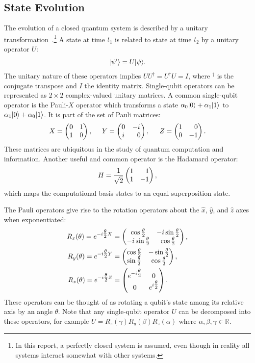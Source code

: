 \subsection{State Evolution} \label{sec:state-evolution}
The evolution of a closed quantum system is described by a unitary transformation~\cite{nielsen2002quantum}.\footnote{In this report, a perfectly closed system is assumed, even though in reality all systems interact somewhat with other systems.}
A state \ket{\psi} at time $t_1$ is related to state  at time $t_2$ by a unitary operator $U$:
\begin{equation}
\vert{\psi'}\rangle = U\vert{\psi}\rangle.
\end{equation}
The unitary nature of these operators implies $UU^\dagger = U^\dagger U = I$, where $^\dagger$ is the conjugate transpose and $I$ the identity matrix.
Single-qubit operators can be represented as $2 \times 2$ complex-valued unitary matrices.
A common single-qubit operator is the Pauli-$X$ operator which transforms a state $\alpha_0\vert{0}\rangle + \alpha_1\vert{1}\rangle$ to $\alpha_1\vert{0}\rangle + \alpha_0\vert{1}\rangle$.
It is part of the set of Pauli matrices:
\begin{equation}
X = \xgate{}, \hspace*{5mm}
Y = \ygate{}, \hspace*{5mm}
Z = \zgate{}.
\end{equation}
These matrices are ubiquitous in the study of quantum computation and information.
Another useful and common operator is the Hadamard operator:
\begin{equation}
H = \hgate{},
\end{equation}
which maps the computational basis states to an equal superposition state.

The Pauli operators give rise to the rotation operators about the $\hat{x}$, $\hat{y}$, and $\hat{z}$ axes when exponentiated:
\begin{align}
R_x(\theta) = e^{-i\tfrac{\theta}{2} X} &= \begin{pmatrix} \cos\tfrac{\theta}{2} & -i\sin\tfrac{\theta}{2} \\ -i\sin\tfrac{\theta}{2} & \cos\tfrac{\theta}{2} \end{pmatrix}{}, \\
R_y(\theta) = e^{-i\tfrac{\theta}{2} Y} &= \begin{pmatrix} \cos\tfrac{\theta}{2} & -\sin\tfrac{\theta}{2} \\ \sin\tfrac{\theta}{2} & \cos\tfrac{\theta}{2} \end{pmatrix}{}, \\
R_z(\theta) = e^{-i\tfrac{\theta}{2} Z} &= \begin{pmatrix} e^{-i\tfrac{\theta}{2}} & 0 \\ 0 & e^{i\tfrac{\theta}{2}} \end{pmatrix}{}.
\end{align}
These operators can be thought of as rotating a qubit's state among its relative axis by an angle $\theta$.
Note that any single-qubit operator $U$ can be decomposed into these operators, for example $U = R_z(\gamma)R_y(\beta)R_z(\alpha)$ where $\alpha, \beta, \gamma \in \mathbb{R}$.

